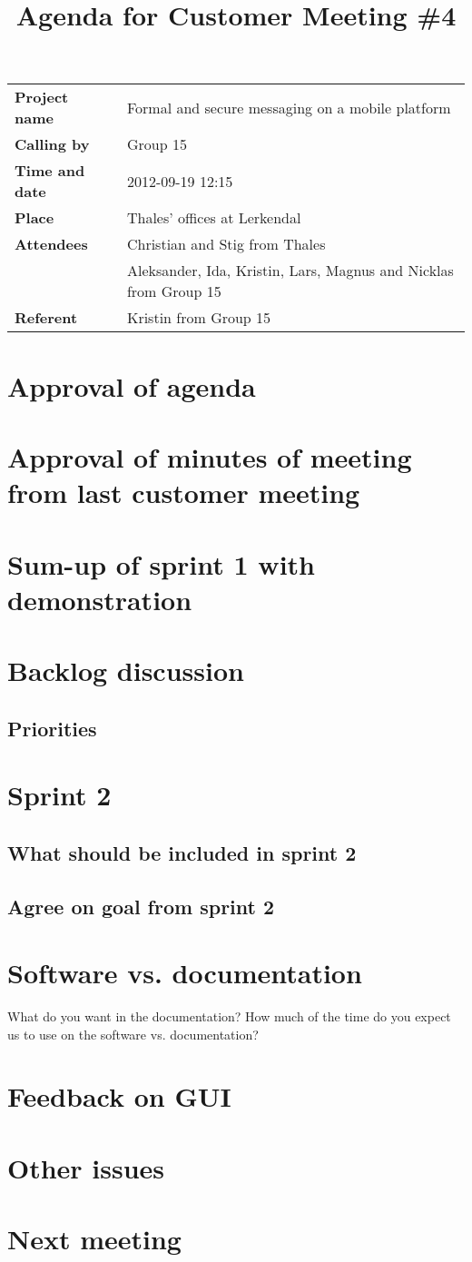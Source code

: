 \documentclass[a4paper,12pt]{article}
\begin{document}
\title{Agenda for Customer Meeting \#4}
\maketitle
\begin{tabular}{>{\bfseries}l l}	
Project name&Formal and secure messaging on a mobile platform\\
Calling by&Group 15\\
Time and date&2012-09-19 12:15\\
Place&Thales' offices at Lerkendal\\
Attendees&Christian and Stig from Thales\\
& Aleksander, Ida, Kristin, Lars, Magnus and Nicklas from Group 15 \\
Referent&Kristin from Group 15\\
\end{tabular}

\section{Approval of agenda}
\section{Approval of minutes of meeting from last customer meeting}
\section{Sum-up of sprint 1 with demonstration}
\section{Backlog discussion}
\subsection{Priorities}
\section{Sprint 2}
\subsection{What should be included in sprint 2}
\subsection{Agree on goal from sprint 2}
\newpage
\section{Software vs. documentation}
What do you want in the documentation? 
\newline
How much of the time do you expect us to use on the software vs. documentation?
\section{Feedback on GUI}
\section{Other issues}
\section{Next meeting}
\end{document}
